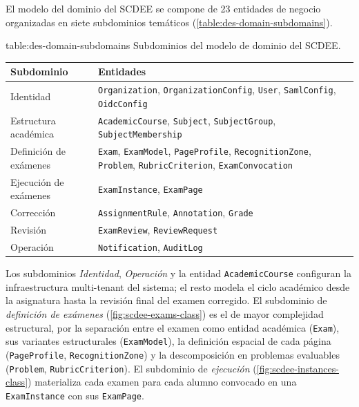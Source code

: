 El modelo del dominio del SCDEE se compone de 23 entidades de negocio
organizadas en siete subdominios temáticos
(\cref{table:des-domain-subdomains}). %

\begin{table}[Subdominios del modelo de dominio]%
            {table:des-domain-subdomains}%
            {Subdominios del modelo de dominio del SCDEE.}
  \small
  \renewcommand{\arraystretch}{1.3}
  \begin{tabular}{p{3.5cm} p{10.5cm}}
    \hline
    \textbf{Subdominio} & \textbf{Entidades} \\
    \hline
    Identidad &
      \texttt{Organization}, \texttt{OrganizationConfig},
      \texttt{User}, \texttt{SamlConfig}, \texttt{OidcConfig} \\
    Estructura académica &
      \texttt{AcademicCourse}, \texttt{Subject},
      \texttt{SubjectGroup}, \texttt{SubjectMembership} \\
    Definición de exámenes &
      \texttt{Exam}, \texttt{ExamModel}, \texttt{PageProfile},
      \texttt{RecognitionZone}, \texttt{Problem},
      \texttt{RubricCriterion}, \texttt{ExamConvocation} \\
    Ejecución de exámenes &
      \texttt{ExamInstance}, \texttt{ExamPage} \\
    Corrección &
      \texttt{AssignmentRule}, \texttt{Annotation}, \texttt{Grade} \\
    Revisión &
      \texttt{ExamReview}, \texttt{ReviewRequest} \\
    Operación &
      \texttt{Notification}, \texttt{AuditLog} \\
    \hline
  \end{tabular}
\end{table}

Los subdominios \emph{Identidad}, \emph{Operación} y la entidad
\texttt{AcademicCourse} configuran la infraestructura multi-tenant del
sistema; el resto modela el ciclo académico desde la asignatura hasta la
revisión final del examen corregido. El subdominio de \emph{definición
de exámenes} (\cref{fig:scdee-exams-class}) es el de mayor complejidad
estructural, por la separación entre el examen como entidad académica
(\texttt{Exam}), sus variantes estructurales (\texttt{ExamModel}), la
definición espacial de cada página (\texttt{PageProfile},
\texttt{RecognitionZone}) y la descomposición en problemas evaluables
(\texttt{Problem}, \texttt{RubricCriterion}). El subdominio de
\emph{ejecución} (\cref{fig:scdee-instances-class}) materializa cada
examen para cada alumno convocado en una \texttt{ExamInstance} con sus
\texttt{ExamPage}.

